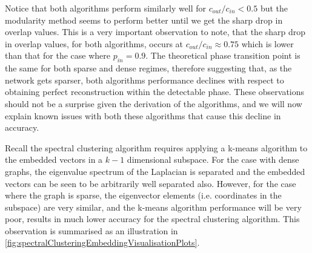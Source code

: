 Notice that both algorithms perform similarly well for $c_{out}/c_{in} < 0.5$ but the modularity method seems to perform better until we get the sharp drop in overlap values.
This is a very important observation to note, that the sharp drop in overlap values, for both algorithms, occurs at $c_{out}/c_{in} \approx 0.75$ which is lower than that for the case where $p_{in}=0.9$.
The theoretical phase transition point is the same for both sparse and dense regimes, therefore suggesting that, as the network gets sparser, both algorithms performance declines with respect to obtaining perfect reconstruction within the detectable phase.
These observations should not be a surprise given the derivation of the algorithms, and we will now explain known issues with both these algorithms that cause this decline in accuracy.

Recall the spectral clustering algorithm requires applying a k-means algorithm to the embedded vectors in a $k-1$ dimensional subspace.
For the case with dense graphs, the eigenvalue spectrum of the Laplacian is separated and the embedded vectors can be seen to be arbitrarily well separated also.
However, for the case where the graph is sparse, the eigenvector elements (i.e. coordinates in the subspace) are very similar, and the k-means algorithm performance will be very poor, results in much lower accuracy for the spectral clustering algorithm.
This observation is summarised as an illustration in \cref{fig:spectralClusteringEmbeddingVisualisationPlots}.

